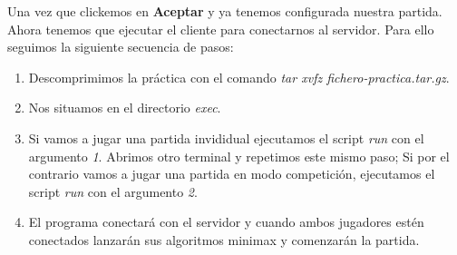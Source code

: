 Una vez que clickemos en \textbf{Aceptar} y ya tenemos configurada nuestra
partida. Ahora tenemos que ejecutar el cliente para conectarnos al
servidor. Para ello seguimos la siguiente secuencia de pasos:
\begin{enumerate}
\item Descomprimimos la práctica con el comando \emph{tar xvfz
    fichero-practica.tar.gz}.
\item Nos situamos en el directorio \emph{exec}.
\item Si vamos a jugar una partida invididual ejecutamos el script
  \emph{run} con el argumento \emph{1}. Abrimos otro terminal y
  repetimos este mismo paso; Si por el contrario vamos a jugar una
  partida en modo competición, ejecutamos el script \emph{run} con el
  argumento \emph{2}.
\item El programa conectará con el servidor y cuando ambos jugadores
  estén conectados lanzarán sus algoritmos minimax y comenzarán la partida.
\end{enumerate}
